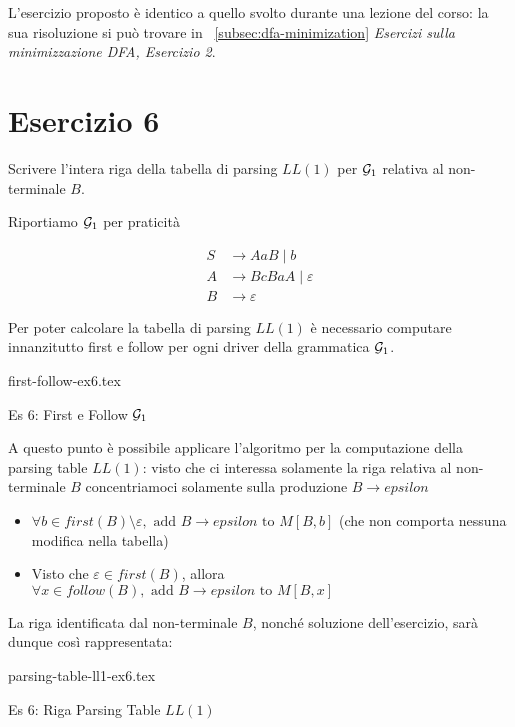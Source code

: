 \documentclass[class=book, crop=false, oneside, 12pt]{standalone}
\begin{document}
L'esercizio proposto è identico a quello svolto durante una lezione del corso: la sua risoluzione si può trovare in ~\ref{subsec:dfa-minimization} \emph{Esercizi sulla minimizzazione DFA, Esercizio 2}.

\section*{Esercizio 6}

Scrivere l’intera riga della tabella di parsing \(LL(1)\) per \(\mathcal{G}_1\) relativa al non-terminale \(B\).

Riportiamo \(\mathcal{G}_1\) per praticità

\begin{align*}
    S &\to AaB \mid b \\
    A &\to BcBaA \mid \varepsilon \\
    B &\to \varepsilon
\end{align*}

Per poter calcolare la tabella di parsing \(LL(1)\) è necessario computare innanzitutto first e follow per ogni driver della grammatica \(\mathcal{G}_1\).

\begin{table}[H]
    \centering
    {first-follow-ex6.tex}
    \caption{Es 6: First e Follow \(\mathcal{G}_1\)}
    \label{tab:first-follow-ex6}
\end{table}

A questo punto è possibile applicare l'algoritmo per la computazione della parsing table \(LL(1)\): visto che ci interessa solamente la riga relativa al non-terminale \(B\) concentriamoci solamente sulla produzione \(B \to epsilon\)

\begin{itemize}
    \item \(\forall b \in first(B) \setminus \varepsilon, \textrm{ add } B \to epsilon \textrm{ to } M[B, b]\) (che non comporta nessuna modifica nella tabella)
    \item Visto che \(\varepsilon \in first(B)\), allora \(\forall x \in follow(B), \textrm{ add } B \to epsilon \textrm{ to } M[B, x]\)
\end{itemize}

La riga identificata dal non-terminale \(B\), nonché soluzione dell'esercizio, sarà dunque così rappresentata:

\begin{table}[H]
    \centering
    {parsing-table-ll1-ex6.tex}
    \caption{Es 6: Riga Parsing Table \(LL(1)\)}
    \label{tab:parsing-table-ll1-ex6}
\end{table}
\end{document}
